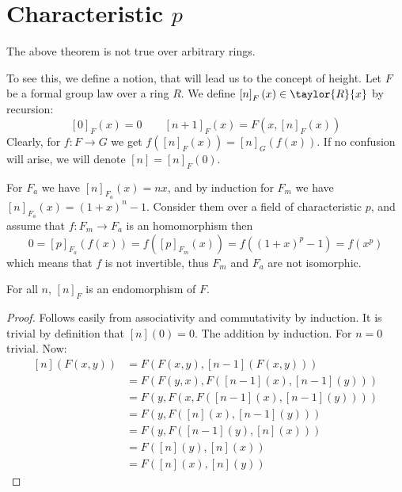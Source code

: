 \section{Characteristic $p$}

\begin{remark*}
	The above theorem is not true over arbitrary rings.
	
	To see this, we define a notion, that will lead us to the concept of height.
	Let $F$ be a formal group law over a ring $R$. We define $\left[n\right]_F \left(x\right) \in \taylor{R}{x}$ by recursion:
	$$
		\left[0\right]_F \left(x\right) = 0
		\qquad
		\left[n+1\right]_F \left(x\right) = F\left(x, \left[n\right]_F \left(x\right)\right)
	$$
	Clearly, for $f: F \to G$ we get
	$
		f\left(\left[n\right]_F \left(x\right)\right)
		=
		\left[n\right]_G \left(f\left(x\right)\right)
	$.
	If no confusion will arise, we will denote $\left[n\right] = \left[n\right]_F\left(0\right)$.
	
	For $F_a$ we have $\left[n\right]_{F_a} \left(x\right) = nx$,
	and by induction for $F_m$ we have $\left[n\right]_{F_a} \left(x\right) = \left(1+x\right)^n - 1$.
	Consider them over a field of characteristic $p$, and assume that $f: F_m \to F_a$ is an homomorphism then
	$$
		0
		=
		\left[p\right]_{F_a} \left(f\left(x\right)\right)
		=
		f\left(\left[p\right]_{F_m} \left(x\right)\right)
		=
		f\left(\left(1+x\right)^p-1\right)
		=
		f\left(x^p\right)
	$$
	which means that $f$ is not invertible, thus $F_m$ and $F_a$ are not isomorphic.
\end{remark*}

\begin{claim*}
	For all $n$, $\left[n\right]_F$ is an endomorphism of $F$.
\end{claim*}

\begin{proof}
	Follows easily from associativity and commutativity by induction.
	It is trivial by definition that $\left[n\right]\left(0\right)=0$.
	The addition by induction. For $n=0$ trivial.
	Now:
	\begin{align*}
		\left[n\right]\left(F\left(x,y\right)\right)
		&= F\left(
			F\left(x,y\right),
			\left[n-1\right]\left(F\left(x,y\right)\right)
		\right)\\
		&= F\left(
			F\left(y,x\right),
			F\left(\left[n-1\right]\left(x\right),\left[n-1\right]\left(y\right)\right)
		\right)\\
		&= F\left(
			y,
			F\left(
				x,
				F\left(\left[n-1\right]\left(x\right),\left[n-1\right]\left(y\right)\right)
			\right)
		\right)\\
		&= F\left(
			y,
			F\left(
				\left[n\right]\left(x\right)
				,\left[n-1\right]\left(y\right)
			\right)
		\right)\\
		&= F\left(
			y,
			F\left(
				\left[n-1\right]\left(y\right),
				\left[n\right]\left(x\right)
			\right)
		\right)\\
		&= F\left(
			\left[n\right]\left(y\right),
			\left[n\right]\left(x\right)
		\right)\\
		&= F\left(
			\left[n\right]\left(x\right),
			\left[n\right]\left(y\right)
		\right)
	\end{align*}
\end{proof}

